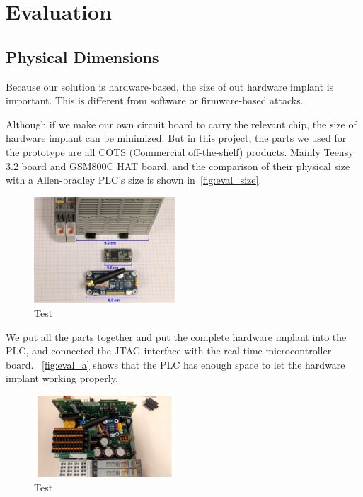 \section{Evaluation}
\label{sec:evaluation}

\subsection{Physical Dimensions}
Because our solution is hardware-based, the size of out hardware implant is important. This is different from software or firmware-based attacks.

Although if we make our own circuit board to carry the relevant chip, the size of hardware implant can be minimized. But in this project, the parts we used for the prototype are all COTS (Commercial off-the-shelf) products. Mainly Teensy 3.2 board and GSM800C HAT board, and the comparison of their physical size with a Allen-bradley PLC's size is shown in~\autoref{fig:eval_size}.

\begin{figure}[th]
	\includegraphics[width=0.47\textwidth]{figures/eval_size}
	\centering
	\caption{Test}
	\label{fig:eval_size}
\end{figure}

We put all the parts together and put the complete hardware implant into the PLC, and connected the JTAG interface with the real-time microcontroller board. ~\autoref{fig:eval_a} shows that the PLC has enough space to let the hardware implant working properly. 

\begin{figure}[th]
	\includegraphics[width=0.47\textwidth]{figures/eval_a}
	\centering
	\caption{Test}
	\label{fig:eval_a}
\end{figure}

